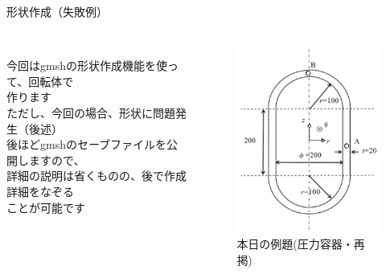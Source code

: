 \begin{frame}{形状作成（失敗例）}
   \begin{columns}[t]
    \begin{column}{0.65\textwidth}
      \\
      今回はgmshの形状作成機能を使って、回転体で\\
      作ります \\
      ただし、今回の場合、形状に問題発生（後述） \\
      \vspace{5mm}
      後ほどgmshのセーブファイルを公開しますので、\\
      詳細の説明は省くものの、後で作成詳細をなぞる\\
      ことが可能です
    \end{column}
    \begin{column}{0.35\textwidth}
      \begin{figure}[htbp]
        \begin{center}
          \includegraphics[keepaspectratio,scale=2.2]{images/example-probrem.png}
            \caption{本日の例題(圧力容器・再掲)}
        \end{center}
      \end{figure}
    \end{column}
  \end{columns}
\end{frame}
